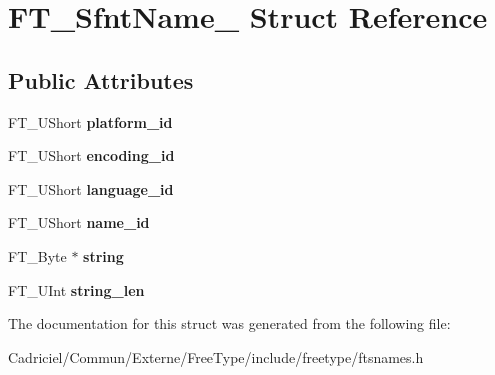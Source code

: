\hypertarget{struct_f_t___sfnt_name__}{}\section{F\+T\+\_\+\+Sfnt\+Name\+\_\+ Struct Reference}
\label{struct_f_t___sfnt_name__}
\subsection*{Public Attributes}
\begin{DoxyCompactItemize}
\item 
F\+T\+\_\+\+U\+Short {\bfseries platform\+\_\+id}\hypertarget{struct_f_t___sfnt_name___ae92450a058eb4737df85f66226d69f43}{}\label{struct_f_t___sfnt_name___ae92450a058eb4737df85f66226d69f43}

\item 
F\+T\+\_\+\+U\+Short {\bfseries encoding\+\_\+id}\hypertarget{struct_f_t___sfnt_name___a01f4573605eab3f4d2e4b9b50b0de98f}{}\label{struct_f_t___sfnt_name___a01f4573605eab3f4d2e4b9b50b0de98f}

\item 
F\+T\+\_\+\+U\+Short {\bfseries language\+\_\+id}\hypertarget{struct_f_t___sfnt_name___a6fb23e0f299a97b25b63805b04cf1fc5}{}\label{struct_f_t___sfnt_name___a6fb23e0f299a97b25b63805b04cf1fc5}

\item 
F\+T\+\_\+\+U\+Short {\bfseries name\+\_\+id}\hypertarget{struct_f_t___sfnt_name___ac07be3e852408990fe0a910f00b68f4e}{}\label{struct_f_t___sfnt_name___ac07be3e852408990fe0a910f00b68f4e}

\item 
F\+T\+\_\+\+Byte $\ast$ {\bfseries string}\hypertarget{struct_f_t___sfnt_name___ab369e2c3d8dc9662f69c53e4d3158067}{}\label{struct_f_t___sfnt_name___ab369e2c3d8dc9662f69c53e4d3158067}

\item 
F\+T\+\_\+\+U\+Int {\bfseries string\+\_\+len}\hypertarget{struct_f_t___sfnt_name___a4ebdb7207b5681d16f9cc17f432cb56f}{}\label{struct_f_t___sfnt_name___a4ebdb7207b5681d16f9cc17f432cb56f}

\end{DoxyCompactItemize}


The documentation for this struct was generated from the following file\+:\begin{DoxyCompactItemize}
\item 
Cadriciel/\+Commun/\+Externe/\+Free\+Type/include/freetype/ftsnames.\+h\end{DoxyCompactItemize}
